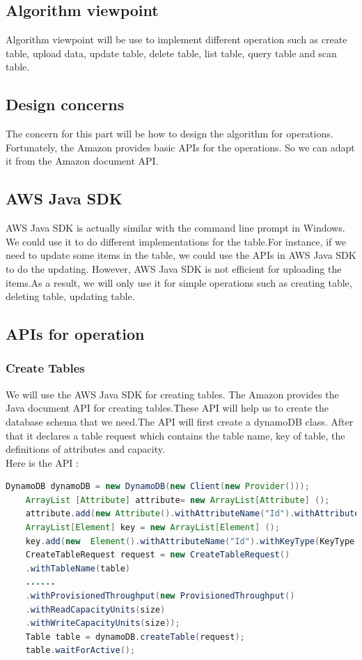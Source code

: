     \subsection{Algorithm viewpoint}
    Algorithm viewpoint will be use to implement different operation such as create table, upload data, update table, delete table, list table, query table and scan table.
    \subsection{Design concerns}
    The concern for this part will be how to design the algorithm for operations. Fortunately, the Amazon provides basic APIs for the operations. So we can adapt it from the Amazon document API. 
    \subsection{AWS Java SDK}
    AWS Java SDK is actually similar with the command line prompt in Windows. We could use it to do different implementations for the table.For instance, if we need to update some items in the table, we could use the APIs in AWS Java SDK to do the updating. However, AWS Java SDK is not efficient for uploading the items.As a result, we will only use it for simple operations such as creating table, deleting table, updating table.
	\subsection{APIs for operation}
 	 	\subsubsection{Create Tables}
    	We will use the AWS Java SDK for creating tables. The Amazon provides the Java document API for creating tables.These API will help us to create the database schema that we need.The API will first create a dynamoDB class. After that it declares a table request which contains the table name, key of table, the definitions of attributes and capacity.\\
    Here is the API\cite{w1} :\\
    \begin{lstlisting}[language=Java, caption=API for create tables]
	DynamoDB dynamoDB = new DynamoDB(new Client(new Provider()));
	ArrayList [Attribute] attribute= new ArrayList[Attribute] ();
	attribute.add(new Attribute().withAttributeName("Id").withAttributeType("N"));
  	ArrayList[Element] key = new ArrayList[Element] ();
 	key.add(new  Element().withAttributeName("Id").withKeyType(KeyType.HASH));
	CreateTableRequest request = new CreateTableRequest()
	.withTableName(table)
	......
	.withProvisionedThroughput(new ProvisionedThroughput()
	.withReadCapacityUnits(size)
	.withWriteCapacityUnits(size));
	Table table = dynamoDB.createTable(request);
	table.waitForActive();
  \end{lstlisting}
